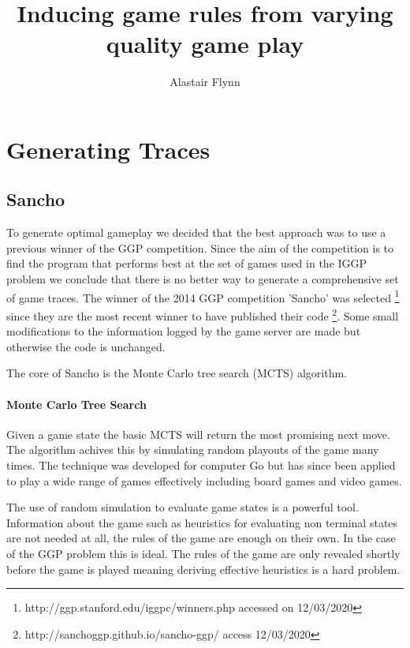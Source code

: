 \documentclass[a4paper,10pt]{report}
\begin{document}
\title{\Large{\textbf{Inducing game rules from varying quality game play}}}
\author{Alastair Flynn}
\maketitle







\chapter{Generating Traces}
\section{Sancho}
To generate optimal gameplay we decided that the best approach was to use a previous winner of the GGP competition. Since the aim of the competition is to find the program that performs best at the set of games used in the IGGP problem we conclude that there is no better way to generate a comprehensive set of game traces. The winner of the 2014 GGP competition 'Sancho' was selected \footnote{http://ggp.stanford.edu/iggpc/winners.php accessed on 12/03/2020} since they are the most recent winner to have published their code \footnote{http://sanchoggp.github.io/sancho-ggp/ access 12/03/2020}. Some small modifications to the information logged by the game server are made but otherwise the code is unchanged.

The core of Sancho is the Monte Carlo tree search (MCTS) algorithm.

\subsubsection{Monte Carlo Tree Search}
Given a game state the basic MCTS will return the most promising next move. The algorithm achives this by simulating random playouts of the game many times. The technique was developed for computer Go but has since been applied to play a wide range of games effectively including board games and video games\cite{Silver/MCTS}\cite{Chaslot/MCTS}.

The use of random simulation to evaluate game states is a powerful tool. Information about the game such as heuristics for evaluating non terminal states are not needed at all, the rules of the game are enough on their own. In the case of the GGP problem this is ideal. The rules of the game are only revealed shortly before the game is played meaning deriving effective heuristics is a hard problem.
\end{document}

